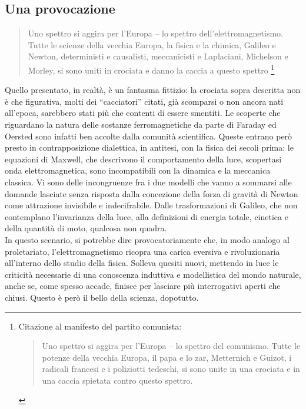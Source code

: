 \documentclass{article}
\begin{document}
\subsection{Una provocazione}
\begin{quote}
Uno spettro si aggira per l’Europa – lo spettro dell’elettromagnetismo. Tutte le scienze della vecchia Europa, la fisica e la chimica, Galileo e Newton, deterministi e causalisti, meccanicisti e Laplaciani, Michelson e Morley,  si sono uniti in crociata e danno la caccia a questo spettro
\footnote{Citazione al manifesto del partito comunista: 
\begin{quote}
Uno spettro si aggira per l’Europa – lo spettro del comunismo. Tutte le potenze della vecchia Europa, il papa e lo
zar, Metternich e Guizot, i radicali francesi e i poliziotti
tedeschi, si sono unite in una crociata e in una caccia spietata contro questo spettro. 
\end{quote}
}
\end{quote}



Quello presentato, in realtà, è un fantasma fittizio: la crociata sopra descritta non è che figurativa, molti dei “cacciatori” citati, già scomparsi o non ancora nati all’epoca, sarebbero stati più che contenti di essere smentiti. Le scoperte che riguardano la natura delle sostanze ferromagnetiche da parte di Faraday ed Oersted sono infatti ben accolte dalla comunità scientifica. Queste entrano però presto in contrapposizione dialettica, in antitesi, con la fisica dei secoli prima: le equazioni di Maxwell, che descrivono il comportamento della luce, scopertasi onda elettromagnetica, sono incompatibili con la dinamica e la meccanica classica. Vi sono delle incongruenze fra i due modelli che vanno a sommarsi  alle domande lasciate senza risposta dalla concezione della forza di gravità di Newton come attrazione invisibile e indecifrabile. Dalle trasformazioni di Galileo, che non contemplano l'invarianza della luce, alla definizioni di energia totale, cinetica e della quantità di moto, qualcosa non quadra.
\\

In questo scenario, si potrebbe dire provocatoriamente che, in modo analogo al proletariato, l’elettromagnetismo ricopra una carica eversiva e rivoluzionaria all’interno dello studio della fisica. Solleva quesiti nuovi, mettendo in luce le criticità necessarie di una conoscenza induttiva e modellistica del mondo naturale, anche se, come spesso accade, finisce per lasciare più interrogativi aperti che chiusi. Questo è però il bello della scienza, dopotutto.
\\
\end{document}
